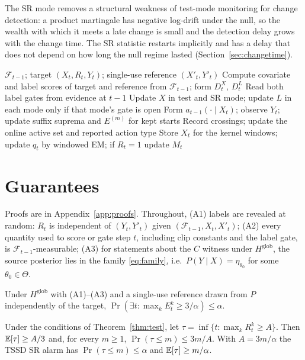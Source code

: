 The SR mode removes a structural weakness of test-mode monitoring for change detection: a product martingale has negative log-drift under the null, so the wealth with which it meets a late change is small and the detection delay grows with the change time. The SR statistic restarts implicitly and has a delay that does not depend on how long the null regime lasted (Section~\ref{sec:changetime}).

\begin{algorithm}[t]
\caption{One TSSD step (both modes share all scores).}
\label{alg:tssd}
\begin{algorithmic}[1]
\Require $\mathcal F_{t-1}$; target $(X_t,R_t,Y_t)$; single-use reference $(X'_t,Y'_t)$
\State Compute covariate and label scores of target and reference from $\mathcal F_{t-1}$; form $D^X_t$, $D^L_t$
\State Read both label gates from evidence at $t-1$
\State Update $X$ in test and SR mode; update $L$ in each mode only if that mode's gate is open
  \State Form $a_{t-1}(\cdot\mid X_t)$; observe $Y_t$; update suffix suprema and $E^{(m)}$ for kept starts
\EndIf
\State Record crossings; update the online active set and reported action type
\State Store $X_t$ for the kernel windows; update $q_t$ by windowed EM; if $R_t=1$ update $M_t$
\end{algorithmic}
\end{algorithm}

\section{Guarantees}
\label{sec:theory}

Proofs are in Appendix~\ref{app:proofs}. Throughout, (A1) labels are revealed at random: $R_t$ is independent of $(Y_t,Y'_t)$ given $(\mathcal F_{t-1},X_t,X'_t)$; (A2) every quantity used to score or gate step $t$, including clip constants and the label gate, is $\mathcal F_{t-1}$-measurable; (A3) for statements about the $C$ witness under $H^{\mathrm{glob}}$, the source posterior lies in the family \eqref{eq:family}, i.e.\ $P(Y\mid X)=\eta_{\theta_0}$ for some $\theta_0\in\Theta$.

\begin{theorem}
\label{thm:test}
Under $H^{\mathrm{glob}}$ with (A1)--(A3) and a single-use reference drawn from $P$ independently of the target, $\Pr(\exists t:\max_kE^k_t\ge 3/\alpha)\le\alpha$.
\end{theorem}

\begin{theorem}
\label{thm:sr}
Under the conditions of Theorem~\ref{thm:test}, let $\tau=\inf\{t:\max_kR^k_t\ge A\}$. Then $\mathbb{E}[\tau]\ge A/3$ and, for every $m\ge1$, $\Pr(\tau\le m)\le 3m/A$. With $A=3m/\alpha$ the TSSD SR alarm has $\Pr(\tau\le m)\le\alpha$ and $\mathbb{E}[\tau]\ge m/\alpha$.
\end{theorem}

